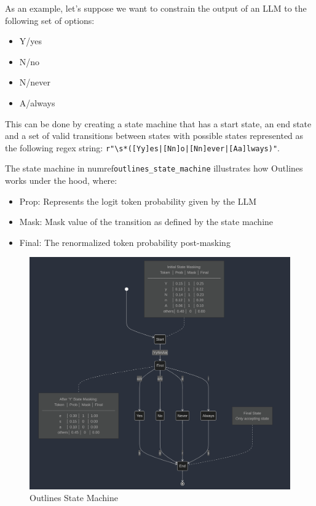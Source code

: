 As an example, let's suppose we want to constrain the output of an LLM to the following set of options: 
\begin{itemize}
    \item Y/yes
    \item N/no  
    \item N/never
    \item A/always
\end{itemize}

This can be done by creating a state machine that has a start state, an end state and a set of valid transitions between states with possible states represented as the following regex string: \texttt{r"\textbackslash s*([Yy]es|[Nn]o|[Nn]ever|[Aa]lways)"}.

The state machine in {numref}\texttt{outlines\_state\_machine} illustrates how Outlines works under the hood, where:
\begin{itemize}
    \item Prop: Represents the logit token probability given by the LLM
    \item Mask: Mask value of the transition as defined by the state machine  
    \item Final: The renormalized token probability post-masking
\end{itemize}

\begin{figure}[h]
\includegraphics[scale=0.5]{../_static/structured_output/outlines_state_machine.png}
\caption{Outlines State Machine \cite{vivien2024regex}}
\label{outlines_state_machine}
\end{figure}

